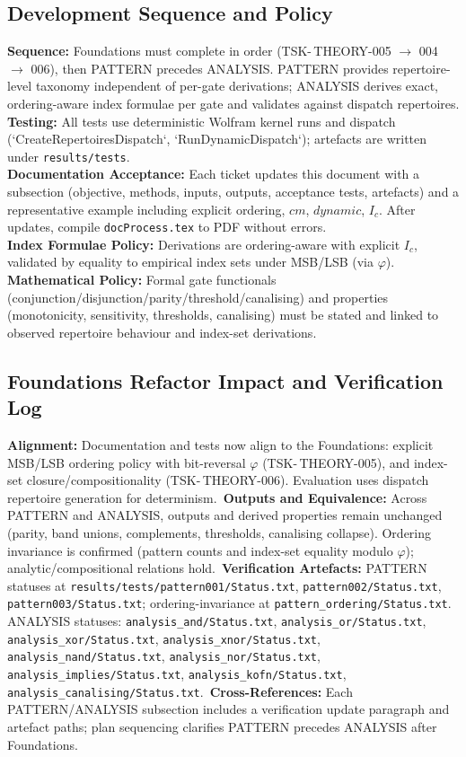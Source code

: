 \documentclass{article}
\begin{document}
\subsection*{Development Sequence and Policy}
\textbf{Sequence:} Foundations must complete in order (TSK-\,THEORY-005 \(\rightarrow\) 004 \(\rightarrow\) 006), then PATTERN precedes ANALYSIS. PATTERN provides repertoire-level taxonomy independent of per-gate derivations; ANALYSIS derives exact, ordering-aware index formulae per gate and validates against dispatch repertoires.\\
\textbf{Testing:} All tests use deterministic Wolfram kernel runs and dispatch (`CreateRepertoiresDispatch`, `RunDynamicDispatch`); artefacts are written under \texttt{results/tests}.\\
\textbf{Documentation Acceptance:} Each ticket updates this document with a subsection (objective, methods, inputs, outputs, acceptance tests, artefacts) and a representative example including explicit ordering, \(cm\), \(dynamic\), \(I_c\). After updates, compile \texttt{docProcess.tex} to PDF without errors.\\
\textbf{Index Formulae Policy:} Derivations are ordering-aware with explicit \(I_c\), validated by equality to empirical index sets under MSB/LSB (via \(\varphi\)).\\
\textbf{Mathematical Policy:} Formal gate functionals (conjunction/disjunction/parity/threshold/canalising) and properties (monotonicity, sensitivity, thresholds, canalising) must be stated and linked to observed repertoire behaviour and index-set derivations.
\subsection*{Foundations Refactor Impact and Verification Log}
\textbf{Alignment:} Documentation and tests now align to the Foundations: explicit MSB/LSB ordering policy with bit-reversal \(\varphi\) (TSK-\,THEORY-005), and index-set closure/compositionality (TSK-\,THEORY-006). Evaluation uses dispatch repertoire generation for determinism.\
\textbf{Outputs and Equivalence:} Across PATTERN and ANALYSIS, outputs and derived properties remain unchanged (parity, band unions, complements, thresholds, canalising collapse). Ordering invariance is confirmed (pattern counts and index-set equality modulo \(\varphi\)); analytic/compositional relations hold.\
\textbf{Verification Artefacts:} PATTERN statuses at \texttt{results/tests/pattern001/Status.txt}, \texttt{pattern002/Status.txt}, \texttt{pattern003/Status.txt}; ordering-invariance at \texttt{pattern\_ordering/Status.txt}. ANALYSIS statuses: \texttt{analysis\_and/Status.txt}, \texttt{analysis\_or/Status.txt}, \texttt{analysis\_xor/Status.txt}, \texttt{analysis\_xnor/Status.txt}, \texttt{analysis\_nand/Status.txt}, \texttt{analysis\_nor/Status.txt}, \texttt{analysis\_implies/Status.txt}, \texttt{analysis\_kofn/Status.txt}, \texttt{analysis\_canalising/Status.txt}.\
\textbf{Cross-References:} Each PATTERN/ANALYSIS subsection includes a verification update paragraph and artefact paths; plan sequencing clarifies PATTERN precedes ANALYSIS after Foundations.
\end{document}

